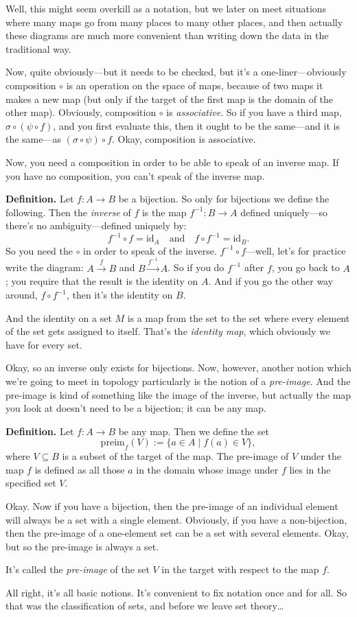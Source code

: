 Well, this might seem overkill as a notation, but we later on meet situations where many maps go from many places to many other places, and then actually these diagrams are much more convenient than writing down the data in the traditional way.

Now, quite obviously---but it needs to be checked, but it's a one-liner---obviously composition $\circ$ is an operation on the space of maps, because of two maps it makes a new map (but only if the target of the first map is the domain of the other map). Obviously, composition $\circ$ is \emph{associative}. So if you have a third map, $\sigma \circ (\psi \circ f)$, and you first evaluate this, then it ought to be the same---and it is the same---as $(\sigma \circ \psi) \circ f$. Okay, composition is associative.

Now, you need a composition in order to be able to speak of an inverse map. If you have no composition, you can't speak of the inverse map.

\textbf{Definition.} Let $f : A \to B$ be a bijection. So only for bijections we define the following. Then the \emph{inverse} of $f$ is the map $f^{-1} : B \to A$ defined uniquely---so there's no ambiguity---defined uniquely by:
\[
f^{-1} \circ f = \mathrm{id}_A \quad \text{and} \quad f \circ f^{-1} = \mathrm{id}_B.
\]
So you need the $\circ$ in order to speak of the inverse. $f^{-1} \circ f$---well, let's for practice write the diagram: $A \xrightarrow{f} B$ and $B \xrightarrow{f^{-1}} A$. So if you do $f^{-1}$ after $f$, you go back to $A$; you require that the result is the identity on $A$. And if you go the other way around, $f \circ f^{-1}$, then it's the identity on $B$.

And the identity on a set $M$ is a map from the set to the set where every element of the set gets assigned to itself. That's the \emph{identity map}, which obviously we have for every set.

Okay, so an inverse only exists for bijections. Now, however, another notion which we're going to meet in topology particularly is the notion of a \emph{pre-image}. And the pre-image is kind of something like the image of the inverse, but actually the map you look at doesn't need to be a bijection; it can be any map.

\textbf{Definition.} Let $f : A \to B$ be any map. Then we define the set
\[
\mathrm{preim}_f(V) := \{ a \in A \mid f(a) \in V \},
\]
where $V \subseteq B$ is a subset of the target of the map. The pre-image of $V$ under the map $f$ is defined as all those $a$ in the domain whose image under $f$ lies in the specified set $V$.

Okay. Now if you have a bijection, then the pre-image of an individual element will always be a set with a single element. Obviously, if you have a non-bijection, then the pre-image of a one-element set can be a set with several elements. Okay, but so the pre-image is always a set.

It's called the \emph{pre-image} of the set $V$ in the target with respect to the map $f$.

All right, it's all basic notions. It's convenient to fix notation once and for all. So that was the classification of sets, and before we leave set theory\ldots
